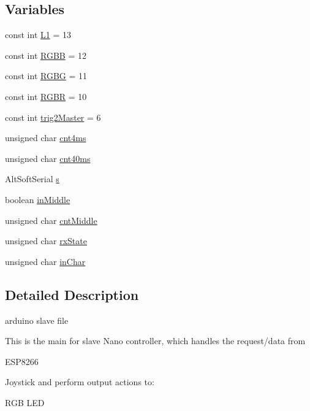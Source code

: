\subsection*{Variables}
\begin{DoxyCompactItemize}
\item 
const int \mbox{\hyperlink{slave_8ino_ad9dd51ba33ad54ebbfc73294ddcd5a4e}{L1}} = 13
\item 
const int \mbox{\hyperlink{slave_8ino_a4e5fb0594384753481b5ec0cb2ae6002}{R\+G\+BB}} = 12
\item 
const int \mbox{\hyperlink{slave_8ino_a02d9fe1f47725a923b1a53dd384f155a}{R\+G\+BG}} = 11
\item 
const int \mbox{\hyperlink{slave_8ino_a5bc0cd51e9659b02a8f4ab34bbe1e827}{R\+G\+BR}} = 10
\item 
const int \mbox{\hyperlink{slave_8ino_af78a75bd42bc29651caa8cdaee48181c}{trig2\+Master}} = 6
\item 
unsigned char \mbox{\hyperlink{slave_8ino_ac5d1ffdf8d27a1d426758f404490cf9f}{cnt4ms}}
\item 
unsigned char \mbox{\hyperlink{slave_8ino_ae5706ef178bfd4a28331580ac6775816}{cnt40ms}}
\item 
Alt\+Soft\+Serial \mbox{\hyperlink{slave_8ino_a104b9456ac0168a4fc542c36d0d6e5c0}{s}}
\item 
boolean \mbox{\hyperlink{slave_8ino_a14307e34d72446f8de465828c44258c0}{in\+Middle}}
\item 
unsigned char \mbox{\hyperlink{slave_8ino_a74b7512e5d4ca1d133f9179dc3a52474}{cnt\+Middle}}
\item 
unsigned char \mbox{\hyperlink{slave_8ino_a1384985077089723c6b018e994fbfb24}{rx\+State}}
\item 
unsigned char \mbox{\hyperlink{slave_8ino_a4d87cdc7ca3ca36af5abb2b043f14ade}{in\+Char}}
\end{DoxyCompactItemize}


\subsection{Detailed Description}
arduino slave file 

This is the main for slave Nano controller, which handles the request/data from
\begin{DoxyItemize}
\item E\+S\+P8266
\item Joystick and perform output actions to\+:
\item R\+GB L\+ED
\end{DoxyItemize}

